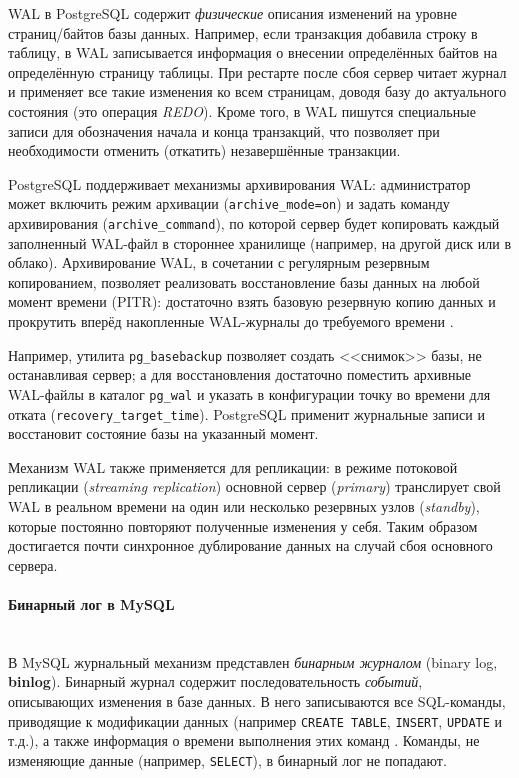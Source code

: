  WAL в PostgreSQL содержит \textit{физические} описания изменений на уровне страниц/байтов базы данных. Например, если транзакция добавила строку в таблицу, в WAL записывается информация о внесении определённых байтов на определённую страницу таблицы. При рестарте после сбоя сервер читает журнал и применяет все такие изменения ко всем страницам, доводя базу до актуального состояния (это операция \textit{REDO}). Кроме того, в WAL пишутся специальные записи для обозначения начала и конца транзакций, что позволяет при необходимости отменить (откатить) незавершённые транзакции. 
 
 PostgreSQL поддерживает механизмы архивирования WAL: администратор может включить режим архивации (\texttt{archive\_mode=on}) и задать команду архивирования (\texttt{archive\_command}), по которой сервер будет копировать каждый заполненный WAL-файл в стороннее хранилище (например, на другой диск или в облако). Архивирование WAL, в сочетании с регулярным резервным копированием, позволяет реализовать восстановление базы данных на любой момент времени (PITR): достаточно взять базовую резервную копию данных и прокрутить вперёд накопленные WAL-журналы до требуемого времени \autocite{PostgreSQLdocc28}. 
 
 Например, утилита \texttt{pg\_basebackup} позволяет создать <<снимок>> базы, не останавливая сервер; а для восстановления достаточно поместить архивные WAL-файлы в каталог \texttt{pg\_wal} и указать в конфигурации точку во времени для отката (\texttt{recovery\_target\_time}). PostgreSQL применит журнальные записи и восстановит состояние базы на указанный момент. 
 
 Механизм WAL также применяется для репликации: в режиме потоковой репликации (\textit{streaming replication}) основной сервер (\textit{primary}) транслирует свой WAL в реальном времени на один или несколько резервных узлов (\textit{standby}), которые постоянно повторяют полученные изменения у себя. Таким образом достигается почти синхронное дублирование данных на случай сбоя основного сервера.

 \paragraph{Бинарный лог в MySQL} ~\\
 
 В MySQL журнальный механизм представлен \textit{бинарным журналом} (binary log, \textbf{binlog}). Бинарный журнал содержит последовательность \textit{событий}, описывающих изменения в базе данных. В него записываются все SQL-команды, приводящие к модификации данных (например \texttt{CREATE TABLE}, \texttt{INSERT}, \texttt{UPDATE} и т.д.), а также информация о времени выполнения этих команд \autocite{Mysqldoc7}. Команды, не изменяющие данные (например, \texttt{SELECT}), в бинарный лог не попадают.
 
